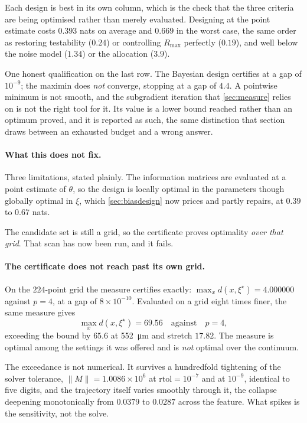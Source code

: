\documentclass[10pt]{article}
\begin{document}
\noindent Each design is best in its own column, which is the check that the three criteria are
being optimised rather than merely evaluated. Designing at the point estimate costs $0.393$ nats
on average and $0.669$ in the worst case, the same order as restoring testability ($0.24$) or
controlling $R_{\max}$ perfectly ($0.19$), and well below the noise model ($1.34$) or the
allocation ($3.9$).

One honest qualification on the last row. The Bayesian design certifies at a gap of
$10^{-9}$; the maximin does \emph{not} converge, stopping at a gap of $4.4$. A pointwise minimum
is not smooth, and the subgradient iteration that \cref{sec:measure} relies on is not the right
tool for it. Its value is a lower bound reached rather than an optimum proved, and it is reported
as such, the same distinction that section draws between an exhausted budget and a wrong
answer.

\paragraph{What this does not fix.}
Three limitations, stated plainly. The information matrices are evaluated at a point estimate
of $\theta$, so the design is locally optimal in the parameters though globally optimal in
$\xi$, which \cref{sec:biasdesign} now prices and partly repairs, at $0.39$ to $0.67$ nats.

The candidate set is still a grid, so the certificate proves optimality \emph{over that grid}.
That scan has now been run, and it fails.

\paragraph{The certificate does not reach past its own grid.}
\label{sec:offgrid} On the $224$-point grid the
measure certifies exactly: $\max_x d(x,\xi^\star) = 4.000000$ against $p = 4$, at a gap of
$8\times10^{-10}$. Evaluated on a grid eight times finer, the same measure gives
%
\begin{equation*}
\max_x d(x,\xi^\star) = 69.56 \quad\text{against}\quad p = 4,
\end{equation*}
%
exceeding the bound by $65.6$ at \SI{552}{\micro\metre} and stretch $17.82$. The measure is
optimal among the settings it was offered and is \emph{not} optimal over the continuum.

The exceedance is not numerical. It survives a hundredfold tightening of the solver tolerance, $\lVert M\rVert = 1.0086\times10^{6}$ at $\text{rtol}=10^{-7}$ and at $10^{-9}$, identical to
five digits, and the trajectory itself varies smoothly through it, the collapse deepening
monotonically from $0.0379$ to $0.0287$ across the feature. What spikes is the sensitivity, not
the solve.
\end{document}
